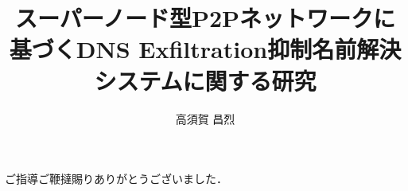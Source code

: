 \documentclass[12pt]{jarticle} %
\title{スーパーノード型P2Pネットワークに基づくDNS Exfiltration抑制名前解決システムに関する研究}
\author{高須賀 昌烈}
\begin{document}
\titlepage
\cmemberspage
\firstabstract
\secondabstract



\toc
\newpage
\listoffigures
\listoftables



\newpage
{}











\newpage
\acknowledgements
ご指導ご鞭撻賜りありがとうございました．
\end{document}
